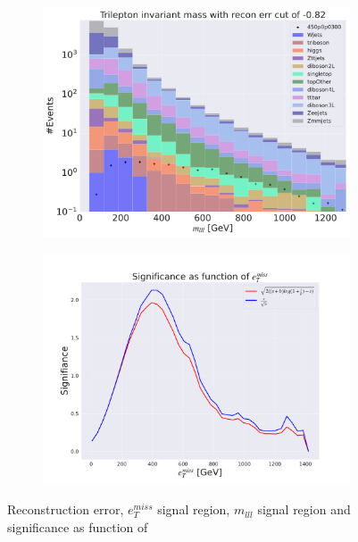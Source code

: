 \begin{figure}[H]
    \hfill
    \begin{subfigure}{.40\textwidth}
        \includegraphics[width=\textwidth]{Figures/VAE_testing/big/3lep/b_data_recon_big_rm3_feats_sig_450p0p0300_mlll_recon_errcut_-0.82.pdf}
        \caption{}
        \label{fig:VAE_3lep_big_mlll_450_2}
    \end{subfigure}
    \hfill   
    \begin{subfigure}{.40\textwidth}
        \includegraphics[width=\textwidth]{Figures/VAE_testing/big/3lep/significance_etmiss_450p0p0300_-0.8226861536678497.pdf}
        \caption{}
        \label{fig:VAE_3lep_big_signi_450_2}
    \end{subfigure}
    \hfill      
    \caption[3lep deep network | $450p300$ | VAE | 2]{Reconstruction error, $e_T^{miss}$ signal region, $m_{lll}$ signal region and significance as function of 
}
\end{figure}

